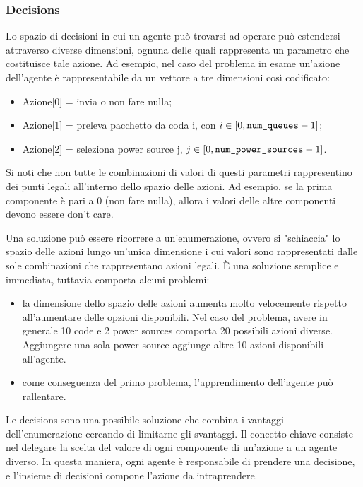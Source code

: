 \documentclass[conference]{IEEEtran}
\begin{document}
\subsubsection{Decisions}
\label{subsec:Decisions}
Lo spazio di decisioni in cui un agente può trovarsi ad operare può estendersi
attraverso
diverse dimensioni, ognuna delle quali rappresenta un parametro che costituisce
tale azione. Ad esempio, nel caso del problema in esame un'azione dell'agente è
rappresentabile da un vettore a tre dimensioni così codificato:
\begin{itemize}
\item Azione[0] = invia o non fare nulla;
\item Azione[1] = preleva pacchetto da coda i, con $i \in [0, \texttt{num\_queues} - 1]$;
\item Azione[2] = seleziona power source j, $j \in [0, \texttt{num\_power\_sources} - 1]$.
\end{itemize}
Si noti che non tutte le combinazioni di valori di questi parametri
rappresentino dei punti legali all'interno dello spazio delle azioni.
Ad esempio, se la prima componente è pari a 0 (non fare nulla), allora i valori delle
altre componenti devono essere don't care.

Una soluzione può essere ricorrere a un'enumerazione, ovvero si "schiaccia"
lo spazio delle azioni lungo un'unica dimensione i cui valori sono rappresentati 
dalle sole combinazioni che rappresentano azioni legali. È una soluzione semplice e
immediata, tuttavia comporta alcuni problemi:
\begin{itemize}
    \item la dimensione dello spazio delle azioni aumenta molto velocemente rispetto
    all'aumentare delle opzioni disponibili. Nel caso del problema, avere in generale
    10 code e 2 power sources comporta 20 possibili azioni diverse. Aggiungere una
    sola power source aggiunge altre 10 azioni disponibili all'agente.
    \item come conseguenza del primo problema, l'apprendimento dell'agente può
    rallentare. %
\end{itemize}
Le decisions sono una possibile soluzione che combina i vantaggi dell'enumerazione
cercando di limitarne gli svantaggi. Il concetto chiave consiste nel delegare la scelta
del valore di ogni componente di un'azione a un agente diverso. In questa maniera,
ogni agente è responsabile di prendere una decisione, e l'insieme di decisioni compone
l'azione da intraprendere. 
\end{document}

